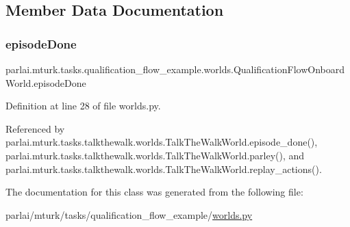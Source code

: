 \subsection{Member Data Documentation}
\mbox{\label{classparlai_1_1mturk_1_1tasks_1_1qualification__flow__example_1_1worlds_1_1QualificationFlowOnboardWorld_aec05fdc93336c41f6a7b190cd4426bc8}} 
\subsubsection{\texorpdfstring{episode\+Done}{episodeDone}}
{\footnotesize\ttfamily parlai.\+mturk.\+tasks.\+qualification\+\_\+flow\+\_\+example.\+worlds.\+Qualification\+Flow\+Onboard\+World.\+episode\+Done}



Definition at line 28 of file worlds.\+py.



Referenced by parlai.\+mturk.\+tasks.\+talkthewalk.\+worlds.\+Talk\+The\+Walk\+World.\+episode\+\_\+done(), parlai.\+mturk.\+tasks.\+talkthewalk.\+worlds.\+Talk\+The\+Walk\+World.\+parley(), and parlai.\+mturk.\+tasks.\+talkthewalk.\+worlds.\+Talk\+The\+Walk\+World.\+replay\+\_\+actions().



The documentation for this class was generated from the following file\+:\begin{DoxyCompactItemize}
\item 
parlai/mturk/tasks/qualification\+\_\+flow\+\_\+example/\hyperlink{parlai_2mturk_2tasks_2qualification__flow__example_2worlds_8py}{worlds.\+py}\end{DoxyCompactItemize}
